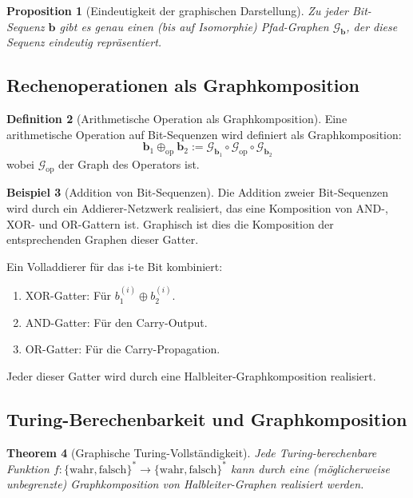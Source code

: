 \documentclass[12pt, a4paper]{article}
\newtheorem{theorem}{Theorem}[section]
\newtheorem{proposition}[theorem]{Proposition}
\theoremstyle{definition}
\newtheorem{definition}[theorem]{Definition}
\newtheorem{example}[theorem]{Beispiel}
\theoremstyle{remark}
\newcommand{\Bool}{\{\mathrm{wahr}, \mathrm{falsch}\}}
\newcommand{\Graph}{\mathcal{G}}
\begin{document}
\begin{proposition}[Eindeutigkeit der graphischen Darstellung]
\label{prop:eindeutigkeit_bit_graph}
Zu jeder Bit-Sequenz $\mathbf{b}$ gibt es genau einen (bis auf Isomorphie) Pfad-Graphen $\Graph_{\mathbf{b}}$, der diese Sequenz eindeutig repräsentiert.
\end{proposition}

\subsection{Rechenoperationen als Graphkomposition}
\label{subsec:rechenoperationen}

\begin{definition}[Arithmetische Operation als Graphkomposition]
\label{def:operation_graphkomposition}
Eine arithmetische Operation auf Bit-Sequenzen wird definiert als Graphkomposition:
\[
  \mathbf{b}_1 \oplus_{\mathrm{op}} \mathbf{b}_2 := \Graph_{\mathbf{b}_1} \circ \Graph_{\mathrm{op}} \circ \Graph_{\mathbf{b}_2}
\]
wobei $\Graph_{\mathrm{op}}$ der Graph des Operators ist.
\end{definition}

\begin{example}[Addition von Bit-Sequenzen]
\label{ex:addition_bit_sequenzen}
Die Addition zweier Bit-Sequenzen wird durch ein Addierer-Netzwerk realisiert, das eine Komposition von AND-, XOR- und OR-Gattern ist. Graphisch ist dies die Komposition der entsprechenden Graphen dieser Gatter.

Ein Volladdierer für das i-te Bit kombiniert:
\begin{enumerate}[label=(\roman*)]
  \item XOR-Gatter: Für $b_1^{(i)} \oplus b_2^{(i)}$.
  \item AND-Gatter: Für den Carry-Output.
  \item OR-Gatter: Für die Carry-Propagation.
\end{enumerate}

Jeder dieser Gatter wird durch eine Halbleiter-Graphkomposition realisiert.
\end{example}

\subsection{Turing-Berechenbarkeit und Graphkomposition}
\label{subsec:turing_graphkomposition}

\begin{theorem}[Graphische Turing-Vollständigkeit]
\label{thm:graphische_turing_vollstaendigkeit}
Jede Turing-berechenbare Funktion $f: \Bool^* \to \Bool^*$ kann durch eine (möglicherweise unbegrenzte) Graphkomposition von Halbleiter-Graphen realisiert werden.
\end{theorem}
\end{document}
